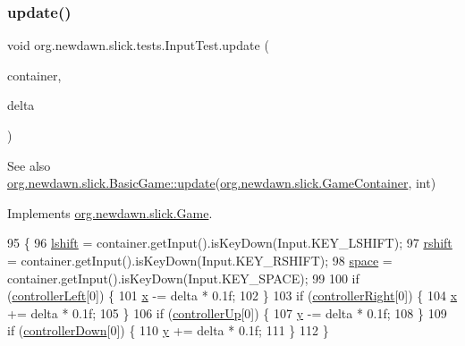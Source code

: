 \subsubsection{\texorpdfstring{update()}{update()}}
{\footnotesize\ttfamily void org.\+newdawn.\+slick.\+tests.\+Input\+Test.\+update (\begin{DoxyParamCaption}\item[{\mbox{\hyperlink{classorg_1_1newdawn_1_1slick_1_1_game_container}{Game\+Container}}}]{container,  }\item[{int}]{delta }\end{DoxyParamCaption})\hspace{0.3cm}{\ttfamily [inline]}}

\begin{DoxySeeAlso}{See also}
\mbox{\hyperlink{classorg_1_1newdawn_1_1slick_1_1_basic_game_acfe6fa05aef83bff1631af91a3e4bd20}{org.\+newdawn.\+slick.\+Basic\+Game\+::update}}(\mbox{\hyperlink{classorg_1_1newdawn_1_1slick_1_1_game_container}{org.\+newdawn.\+slick.\+Game\+Container}}, int) 
\end{DoxySeeAlso}


Implements \mbox{\hyperlink{interfaceorg_1_1newdawn_1_1slick_1_1_game_ab07b2e9463ee4631620dde0de25bdee8}{org.\+newdawn.\+slick.\+Game}}.


\begin{DoxyCode}
95                                                            \{
96         \mbox{\hyperlink{classorg_1_1newdawn_1_1slick_1_1tests_1_1_input_test_a6fa7061e34b10500b50e91b61a42471c}{lshift}} = container.getInput().isKeyDown(Input.KEY\_LSHIFT);
97         \mbox{\hyperlink{classorg_1_1newdawn_1_1slick_1_1tests_1_1_input_test_a6711d640aa0bc08c7076cc521e7c3b49}{rshift}} = container.getInput().isKeyDown(Input.KEY\_RSHIFT);
98         \mbox{\hyperlink{classorg_1_1newdawn_1_1slick_1_1tests_1_1_input_test_a1eecff134bda6848d619fe56fa8c9aae}{space}} = container.getInput().isKeyDown(Input.KEY\_SPACE); 
99         
100         \textcolor{keywordflow}{if} (\mbox{\hyperlink{classorg_1_1newdawn_1_1slick_1_1_basic_game_ab9942a3607c7c1bb9f68c7f49514edb6}{controllerLeft}}[0]) \{
101             \mbox{\hyperlink{classorg_1_1newdawn_1_1slick_1_1tests_1_1_input_test_a95f99c94f1e661a629501a3205d78c15}{x}} -= delta * 0.1f;
102         \}
103         \textcolor{keywordflow}{if} (\mbox{\hyperlink{classorg_1_1newdawn_1_1slick_1_1_basic_game_a63084cb6b54023c5c9dc4f27aa611e38}{controllerRight}}[0]) \{
104             \mbox{\hyperlink{classorg_1_1newdawn_1_1slick_1_1tests_1_1_input_test_a95f99c94f1e661a629501a3205d78c15}{x}} += delta * 0.1f;
105         \}
106         \textcolor{keywordflow}{if} (\mbox{\hyperlink{classorg_1_1newdawn_1_1slick_1_1_basic_game_ac57500e9873e5634ed07cdba8b9c1d58}{controllerUp}}[0]) \{
107             \mbox{\hyperlink{classorg_1_1newdawn_1_1slick_1_1tests_1_1_input_test_a18ce34ad5ddc268a0420c747d5b19d05}{y}} -= delta * 0.1f;
108         \}
109         \textcolor{keywordflow}{if} (\mbox{\hyperlink{classorg_1_1newdawn_1_1slick_1_1_basic_game_a1e5447288fb667f4a688b930899379cb}{controllerDown}}[0]) \{
110             \mbox{\hyperlink{classorg_1_1newdawn_1_1slick_1_1tests_1_1_input_test_a18ce34ad5ddc268a0420c747d5b19d05}{y}} += delta * 0.1f;
111         \}
112     \}
\end{DoxyCode}


